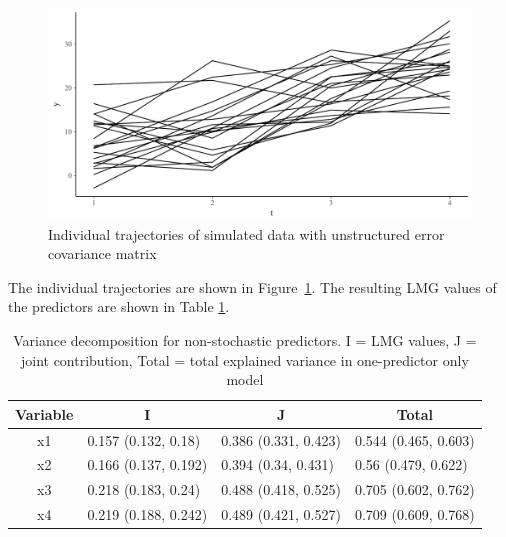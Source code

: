 \documentclass[11pt,a4paper,twoside]{book}
\newenvironment{knitrout}{}{} %
\begin{document}
\begin{knitrout}
\color{fgcolor}\begin{figure}

{\centering \includegraphics[width=\textwidth-3cm]{figure/ch04_figsimdata_repeated_unstruct_plot-1} 

}

\caption[Individual trajectories of simulated data with unstructured error covariance matrix]{Individual trajectories of simulated data with unstructured error covariance matrix}\label{fig:simdata.repeated.unstruct.plot}
\end{figure}


\end{knitrout}




The individual trajectories are shown in Figure~\ref{fig:simdata.repeated.unstruct.plot}. The resulting LMG values of the predictors are shown in Table \ref{tbl:repeated.unstructured}.

\begin{table}[h]
\caption{Variance decomposition for non-stochastic predictors. I = LMG values, J = joint contribution, Total = total explained variance in one-predictor only model}
\centering
\begin{tabular}{clll}
  \toprule
  \multicolumn{1}{c}{\textbf{Variable}} & \multicolumn{1}{c}{\textbf{I}} &\multicolumn{1}{c}{\textbf{J}} & \multicolumn{1}{c}{\textbf{Total}} \\
  \hline
x1 & 0.157 (0.132, 0.18)  & 0.386 (0.331, 0.423)   & 0.544 (0.465, 0.603)  \\ 
x2 & 0.166 (0.137, 0.192)  & 0.394 (0.34, 0.431)   & 0.56 (0.479, 0.622)  \\ 
x3 & 0.218 (0.183, 0.24)  & 0.488 (0.418, 0.525)   & 0.705 (0.602, 0.762)  \\ 
x4 & 0.219 (0.188, 0.242)  & 0.489 (0.421, 0.527)   & 0.709 (0.609, 0.768)  \\ 
   \bottomrule
\end{tabular}
\label{tbl:repeated.unstructured}
\end{table}



 

\end{document}
